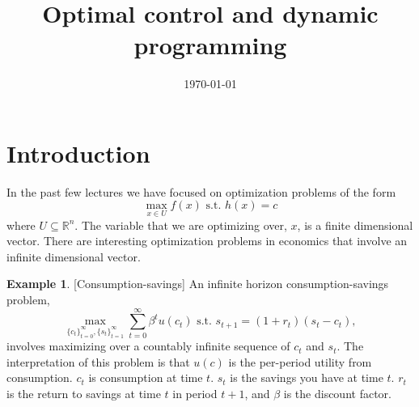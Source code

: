 \documentclass[12pt,reqno]{amsart}
\title{Optimal control and dynamic programming}
\date{\today}
\theoremstyle{definition}
\newtheorem{example}{Example}[section]
\def\R{\mathbb{R}}
\begin{document}
\maketitle

\section{Introduction} 

In the past few lectures we have focused on optimization problems of the form 
\[ \max_{x \in U} f(x) \text{ s.t. } h(x) = c \]
where $U \subseteq \R^n$. The variable that we are optimizing over,
$x$, is a finite dimensional vector. There are interesting
optimization problems in economics that involve an infinite
dimensional vector. 

\begin{example}\label{ex:consav}[Consumption-savings]
  An infinite horizon consumption-savings problem, 
  \[ \max_{\{c_t\}_{t=0}^\infty,\{s_t\}_{t=1}^\infty} \sum_{t=0}^\infty
  \beta^t u(c_t) \text{ s.t. } s_{t+1} = (1+r_t)(s_t - c_t), \]  
  involves maximizing over a countably infinite sequence of $c_t$ and
  $s_t$. The interpretation of this problem is that $u(c)$ is the
  per-period utility from consumption. $c_t$ is consumption at time
  $t$. $s_t$ is the savings you have at time $t$. $r_t$ is the return to
  savings at time $t$ in period $t+1$, and $\beta$ is the discount
  factor. 
\end{example}
\end{document}
